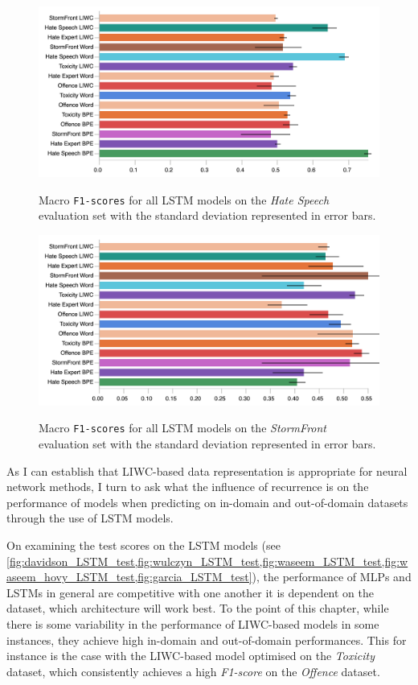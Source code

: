\begin{figure}
\begin{minipage}{\textwidth}
    \centering
    \includegraphics[width=\textwidth]{all_LSTM_waseem_hovy_test.pdf}
    \caption{Macro \texttt{F1-scores} for all LSTM models on the \textit{Hate Speech} evaluation set with the standard deviation represented in error bars.}
  \label{fig:waseem_hovy_LSTM_test}  
  \vfill
    \includegraphics[width=\textwidth]{all_LSTM_garcia_test.pdf}
  \caption{Macro \texttt{F1-scores} for all LSTM models on the \textit{StormFront} evaluation set with the standard deviation represented in error bars.}
  \label{fig:garcia_LSTM_test}
\end{minipage}
\end{figure}

As I can establish that LIWC-based data representation is appropriate for  neural network methods, I turn to ask what the influence of recurrence is on the performance of models when predicting on in-domain and out-of-domain datasets through the use of LSTM models.

On examining the test scores on the LSTM models (see \cref{fig:davidson_LSTM_test,fig:wulczyn_LSTM_test,fig:waseem_LSTM_test,fig:waseem_hovy_LSTM_test,fig:garcia_LSTM_test}),  the performance of MLPs and LSTMs in general are competitive with one another  it is dependent on the dataset, which  architecture will work best.
To the point of this chapter, while there is some variability in the performance of LIWC-based models in some instances, they achieve high in-domain and out-of-domain performances.
This for instance is the case with the LIWC-based model optimised on the \textit{Toxicity} dataset, which consistently achieves a high \textit{F1-score} on the \textit{Offence} dataset.

